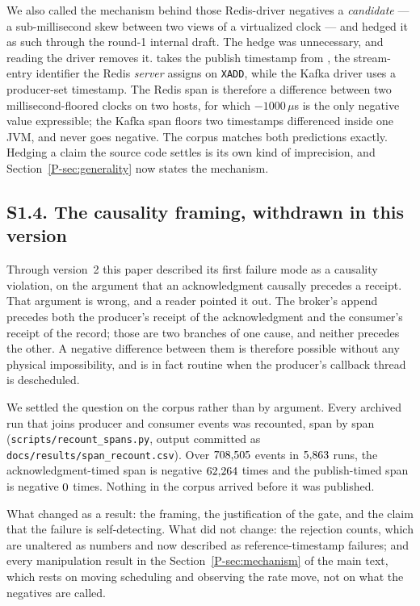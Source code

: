\documentclass[10pt,journal,onecolumn]{IEEEtran}
\newcommand{\mainGenerality}{\ref{P-sec:generality}}       %
\newcommand{\mainModeA}{\ref{P-sec:mechanism}}             %
\begin{document}
We also called the mechanism behind those Redis-driver negatives a \emph{candidate} --- a
sub-millisecond skew between two views of a virtualized clock --- and hedged it as such
through the round-1 internal draft. The hedge was unnecessary, and reading the driver removes
it.  takes the publish timestamp from
, the stream-entry identifier the Redis \emph{server}
assigns on \texttt{XADD}, while the Kafka driver uses a producer-set timestamp. The Redis span
is therefore a difference between two millisecond-floored clocks on two hosts, for which
$-1000\,\mu$s is the only negative value expressible; the Kafka span floors two timestamps
differenced inside one JVM, and never goes negative. The corpus matches both predictions
exactly. Hedging a claim the source code settles is its own kind of imprecision, and
Section~\mainGenerality{} now states the mechanism.

\subsection{S1.4. The causality framing, withdrawn in this version}

Through version~2 this paper described its first failure mode as a causality violation, on the
argument that an acknowledgment causally precedes a receipt. That argument is wrong, and a
reader pointed it out. The broker's append precedes both the producer's receipt of the
acknowledgment and the consumer's receipt of the record; those are two branches of one
cause, and neither precedes the other. A negative difference between them is therefore
possible without any physical impossibility, and is in fact routine when the producer's
callback thread is descheduled.

We settled the question on the corpus rather than by argument. Every archived run that joins
producer and consumer events was recounted, span by span
(\texttt{scripts/recount\_spans.py}, output committed as
\texttt{docs/results/span\_recount.csv}). Over $708{,}505$ events in $5{,}863$ runs, the
acknowledgment-timed span is negative $62{,}264$ times and the publish-timed span
is negative $0$ times. Nothing in the corpus arrived before it was published.

What changed as a result: the framing, the justification of the gate, and the claim that the
failure is self-detecting. What did not change: the rejection counts, which are unaltered as
numbers and now described as reference-timestamp failures; and every manipulation result in the
Section~\mainModeA{} of the main text, which rests on moving scheduling and observing the
rate move, not on what the negatives are called.
\end{document}
